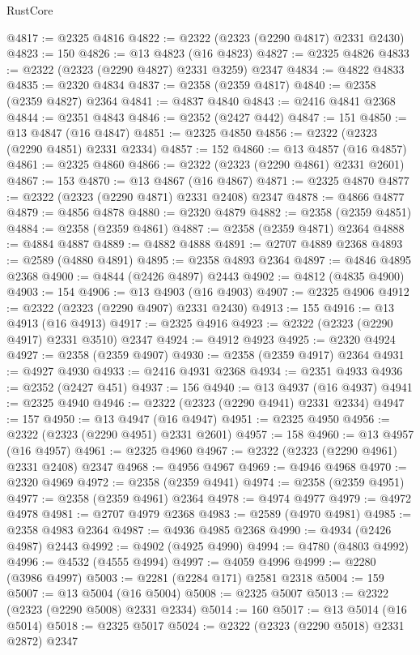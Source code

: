\begin{lexlean}{RustCore}
\begin{coremodule}
@4817 := @2325 @4816
@4822 := @2322 (@2323 (@2290 @4817) @2331 @2430)
@4823 := 150
@4826 := @13 @4823 (@16 @4823)
@4827 := @2325 @4826
@4833 := @2322 (@2323 (@2290 @4827) @2331 @3259) @2347
@4834 := @4822 @4833
@4835 := @2320 @4834
@4837 := @2358 (@2359 @4817)
@4840 := @2358 (@2359 @4827) @2364
@4841 := @4837 @4840
@4843 := @2416 @4841 @2368
@4844 := @2351 @4843
@4846 := @2352 (@2427 @442)
@4847 := 151
@4850 := @13 @4847 (@16 @4847)
@4851 := @2325 @4850
@4856 := @2322 (@2323 (@2290 @4851) @2331 @2334)
@4857 := 152
@4860 := @13 @4857 (@16 @4857)
@4861 := @2325 @4860
@4866 := @2322 (@2323 (@2290 @4861) @2331 @2601)
@4867 := 153
@4870 := @13 @4867 (@16 @4867)
@4871 := @2325 @4870
@4877 := @2322 (@2323 (@2290 @4871) @2331 @2408) @2347
@4878 := @4866 @4877
@4879 := @4856 @4878
@4880 := @2320 @4879
@4882 := @2358 (@2359 @4851)
@4884 := @2358 (@2359 @4861)
@4887 := @2358 (@2359 @4871) @2364
@4888 := @4884 @4887
@4889 := @4882 @4888
@4891 := @2707 @4889 @2368
@4893 := @2589 (@4880 @4891)
@4895 := @2358 @4893 @2364
@4897 := @4846 @4895 @2368
@4900 := @4844 (@2426 @4897) @2443
@4902 := @4812 (@4835 @4900)
@4903 := 154
@4906 := @13 @4903 (@16 @4903)
@4907 := @2325 @4906
@4912 := @2322 (@2323 (@2290 @4907) @2331 @2430)
@4913 := 155
@4916 := @13 @4913 (@16 @4913)
@4917 := @2325 @4916
@4923 := @2322 (@2323 (@2290 @4917) @2331 @3510) @2347
@4924 := @4912 @4923
@4925 := @2320 @4924
@4927 := @2358 (@2359 @4907)
@4930 := @2358 (@2359 @4917) @2364
@4931 := @4927 @4930
@4933 := @2416 @4931 @2368
@4934 := @2351 @4933
@4936 := @2352 (@2427 @451)
@4937 := 156
@4940 := @13 @4937 (@16 @4937)
@4941 := @2325 @4940
@4946 := @2322 (@2323 (@2290 @4941) @2331 @2334)
@4947 := 157
@4950 := @13 @4947 (@16 @4947)
@4951 := @2325 @4950
@4956 := @2322 (@2323 (@2290 @4951) @2331 @2601)
@4957 := 158
@4960 := @13 @4957 (@16 @4957)
@4961 := @2325 @4960
@4967 := @2322 (@2323 (@2290 @4961) @2331 @2408) @2347
@4968 := @4956 @4967
@4969 := @4946 @4968
@4970 := @2320 @4969
@4972 := @2358 (@2359 @4941)
@4974 := @2358 (@2359 @4951)
@4977 := @2358 (@2359 @4961) @2364
@4978 := @4974 @4977
@4979 := @4972 @4978
@4981 := @2707 @4979 @2368
@4983 := @2589 (@4970 @4981)
@4985 := @2358 @4983 @2364
@4987 := @4936 @4985 @2368
@4990 := @4934 (@2426 @4987) @2443
@4992 := @4902 (@4925 @4990)
@4994 := @4780 (@4803 @4992)
@4996 := @4532 (@4555 @4994)
@4997 := @4059 @4996
@4999 := @2280 (@3986 @4997)
@5003 := @2281 (@2284 @171) @2581 @2318
@5004 := 159
@5007 := @13 @5004 (@16 @5004)
@5008 := @2325 @5007
@5013 := @2322 (@2323 (@2290 @5008) @2331 @2334)
@5014 := 160
@5017 := @13 @5014 (@16 @5014)
@5018 := @2325 @5017
@5024 := @2322 (@2323 (@2290 @5018) @2331 @2872) @2347

\end{coremodule}
\end{lexlean}
